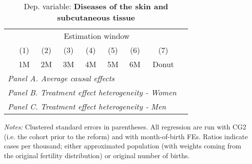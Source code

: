  \begin{table}[H] \begin{threeparttable} \centering \caption{Dep. variable: \textbf{Diseases of the skin and subcutaneous tissue}} {\def\sym#1{\ifmmode^{#1}\else\(^{#1}\)\fi} \begin{tabular}{l*{8}{c}} \toprule & \multicolumn{7}{c}{Estimation window} \\ \cmidrule(lr){2-8}
            &\multicolumn{1}{c}{(1)}&\multicolumn{1}{c}{(2)}&\multicolumn{1}{c}{(3)}&\multicolumn{1}{c}{(4)}&\multicolumn{1}{c}{(5)}&\multicolumn{1}{c}{(6)}&\multicolumn{1}{c}{(7)}\\
            &\multicolumn{1}{c}{1M}&\multicolumn{1}{c}{2M}&\multicolumn{1}{c}{3M}&\multicolumn{1}{c}{4M}&\multicolumn{1}{c}{5M}&\multicolumn{1}{c}{6M}&\multicolumn{1}{c}{Donut}\\
\midrule
 \multicolumn{8}{l}{\emph{Panel A. Average causal effects}} \\       \midrule\multicolumn{8}{l}{\emph{Panel B. Treatment effect heterogeneity - Women}} \\       \midrule\multicolumn{8}{l}{\emph{Panel C. Treatment effect heterogeneity - Men}} \\       
\bottomrule \end{tabular} } \begin{tablenotes} \item \scriptsize \emph{Notes:} Clustered standard errors in parentheses. All regression are run with CG2 (i.e. the cohort prior to the reform) and with month-of-birth FEs. Ratios indicate cases per thousand; either approximated population (with weights coming from the original fertility distribution) or original number of births. \end{tablenotes} \end{threeparttable} \end{table} 
